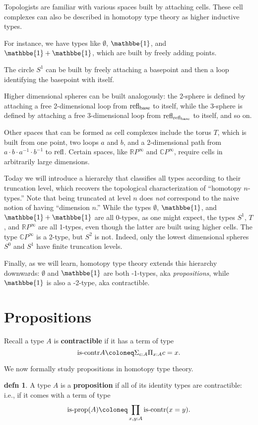 \documentclass{amsart}
\theoremstyle{theorem}
\theoremstyle{definition}
\newtheorem*{defn}{defn}
\theoremstyle{remark}
\newcommand{\0}{\mathbbe{0}}
\newcommand{\1}{\mathbbe{1}}
\newcommand{\2}{\mathbbe{2}}
\newcommand{\3}{\mathbbe{3}}
\newcommand{\4}{\mathbbe{4}}
\newcommand{\term}[1]{{\textup{#1}}}
\newcommand{\type}[1]{{\textup{#1}}}
\newcommand{\refl}{\term{refl}}
\newcommand{\is}[1]{\type{is-{#1}}}
\newcommand{\iscontr}{\type{is-contr}}
\newcommand{\base}{\term{base}}
\begin{document}
Topologists are familiar with various spaces built by attaching cells. These cell complexes can also be described in homotopy type theory as higher inductive types.

For instance, we have types like $\emptyset$, $\1$, and $\1+\1$, which are built by freely adding points.

The circle $S^1$ can be built by freely attaching a basepoint and then a loop identifying the basepoint with itself. 

Higher dimensional spheres can be built analogously: the 2-sphere is defined by attaching a free 2-dimensional loop from $\refl_\base$ to itself, while the 3-sphere is defined by attaching a free 3-dimensional loop from $\refl_{\refl_\base}$ to itself, and so on.

Other spaces that can be formed as cell complexes include the torus $T$, which is built from one point, two loops $a$ and $b$, and a 2-dimensional path from $a \cdot b \cdot a^{-1} \cdot b^{-1}$ to $\refl$. Certain spaces, like $\mathbb{R}P^\infty$ and $\mathbb{C}P^\infty$, require cells in arbitrarily large dimensions.

Today we will introduce a hierarchy that classifies all types according to their truncation level, which recovers the topological characterization of ``homotopy $n$-types.'' Note that being truncated at level $n$ does \emph{not} correspond to the naive notion of having ``dimension $n$.'' While the types $\emptyset$, $\1$, and $\1+\1$ are all 0-types, as one might expect, the types $S^1$, $T$, and $\mathbb{R}P^\infty$ are all 1-types, even though the latter are built using higher cells. The type $\mathbb{C}P^\infty$ is a 2-type, but $S^2$ is not. Indeed, only the lowest dimensional spheres $S^0$ and $S^1$ have finite truncation levels.

Finally, as we will learn, homotopy type theory extends this hierarchy downwards: $\emptyset$ and $\1$ are both -1-types, aka \emph{propositions}, while $\1$ is also a -2-type, aka contractible.  

\section*{Propositions}

Recall a type $A$ is \textbf{contractible} if it has a term of type
\[ \iscontr{A} \coloneq \Sigma_{c :A}\Pi_{x:A} c =x.\]

We now formally study propositions in homotopy type theory.

\begin{defn} A type $A$ is a \textbf{proposition} if all of its identity types are contractible: i.e., if it comes with a term of type
\[ \is{prop}(A) \coloneq \prod_{x,y:A} \is{contr}(x=y).\]
\end{defn}
\end{document}
